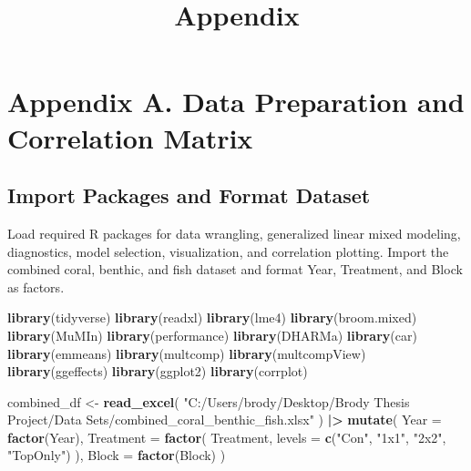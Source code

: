 \documentclass[
]{article}
\title{Appendix}
\author{}
\date{\vspace{-2.5em}}
\newenvironment{Shaded}{\begin{snugshade}}{\end{snugshade}}
\newcommand{\AttributeTok}[1]{\textcolor[rgb]{0.13,0.29,0.53}{#1}}
\newcommand{\FunctionTok}[1]{\textcolor[rgb]{0.13,0.29,0.53}{\textbf{#1}}}
\newcommand{\NormalTok}[1]{#1}
\newcommand{\OtherTok}[1]{\textcolor[rgb]{0.56,0.35,0.01}{#1}}
\newcommand{\SpecialCharTok}[1]{\textcolor[rgb]{0.81,0.36,0.00}{\textbf{#1}}}
\newcommand{\StringTok}[1]{\textcolor[rgb]{0.31,0.60,0.02}{#1}}
\begin{document}
\maketitle

\section{Appendix A. Data Preparation and Correlation
Matrix}\label{appendix-a.-data-preparation-and-correlation-matrix}

\subsection{Import Packages and Format
Dataset}\label{import-packages-and-format-dataset}

Load required R packages for data wrangling, generalized linear mixed
modeling, diagnostics, model selection, visualization, and correlation
plotting. Import the combined coral, benthic, and fish dataset and
format Year, Treatment, and Block as factors.

\begin{Shaded}
\begin{Highlighting}[]
\FunctionTok{library}\NormalTok{(tidyverse)}
\FunctionTok{library}\NormalTok{(readxl)}
\FunctionTok{library}\NormalTok{(lme4)}
\FunctionTok{library}\NormalTok{(broom.mixed)}
\FunctionTok{library}\NormalTok{(MuMIn)}
\FunctionTok{library}\NormalTok{(performance)}
\FunctionTok{library}\NormalTok{(DHARMa)}
\FunctionTok{library}\NormalTok{(car)}
\FunctionTok{library}\NormalTok{(emmeans)}
\FunctionTok{library}\NormalTok{(multcomp)}
\FunctionTok{library}\NormalTok{(multcompView)}
\FunctionTok{library}\NormalTok{(ggeffects)}
\FunctionTok{library}\NormalTok{(ggplot2)}
\FunctionTok{library}\NormalTok{(corrplot)}

\NormalTok{combined\_df }\OtherTok{\textless{}{-}} \FunctionTok{read\_excel}\NormalTok{(}
  \StringTok{"C:/Users/brody/Desktop/Brody Thesis Project/Data Sets/combined\_coral\_benthic\_fish.xlsx"}
\NormalTok{) }\SpecialCharTok{|\textgreater{}}
  \FunctionTok{mutate}\NormalTok{(}
    \AttributeTok{Year =} \FunctionTok{factor}\NormalTok{(Year),}
    \AttributeTok{Treatment =} \FunctionTok{factor}\NormalTok{(}
\NormalTok{      Treatment,}
      \AttributeTok{levels =} \FunctionTok{c}\NormalTok{(}\StringTok{"Con"}\NormalTok{, }\StringTok{"1x1"}\NormalTok{, }\StringTok{"2x2"}\NormalTok{, }\StringTok{"TopOnly"}\NormalTok{)}
\NormalTok{    ),}
    \AttributeTok{Block =} \FunctionTok{factor}\NormalTok{(Block)}
\NormalTok{  )}
\end{Highlighting}
\end{Shaded}
\end{document}

